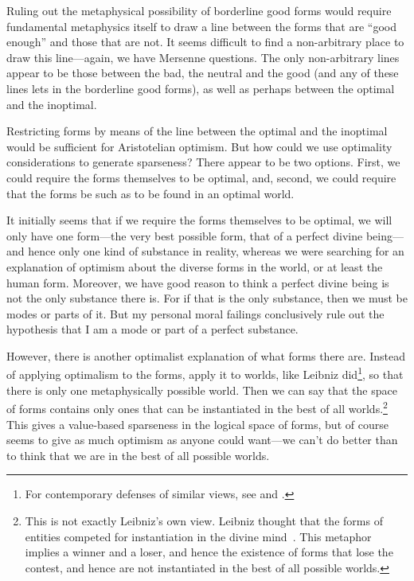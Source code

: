 Ruling out the metaphysical possibility of borderline good forms would require fundamental metaphysics itself to 
draw a line between the forms that are ``good enough'' and those that are not. It seems difficult to find a non-arbitrary
place to draw this line---again, we have Mersenne questions. The only non-arbitrary lines appear to be those between
the bad, the neutral and the good (and any of these lines lets in the borderline good forms), as well as perhaps 
between the optimal and the inoptimal.

Restricting forms by means of the line between the optimal and the inoptimal would be sufficient for Aristotelian 
optimism. But how could we use optimality considerations to generate sparseness? There appear to be two options. First,
we could require the forms themselves to be optimal, and, second, we could require that the forms be such as to be found
in an optimal world. 

It initially seems that if we require the forms themselves to be optimal, we will only have one form---the very best
possible form, that of a perfect divine being---and hence only one kind of substance in reality, whereas we were searching for an 
explanation of optimism about the diverse forms in the world, or at least the human form. Moreover, we have good reason to 
think a perfect divine being is not the only substance there is. For if that is the only substance, then we must be modes or 
parts of it. But my personal moral failings conclusively rule out the hypothesis that I am a mode or part of a perfect 
substance.

However, there is another optimalist explanation of what forms there are. Instead of applying optimalism to the forms, 
apply it to worlds, like Leibniz did\footnote{For contemporary defenses of similar views, see  and .}, so that there is only one metaphysically possible world. 
Then we can say that the space of forms contains only ones that 
can be instantiated in the best of all worlds.\footnote{This is not exactly Leibniz's own view. Leibniz thought
that the forms of entities competed for instantiation in the divine mind~\parencite[150]{LeibnizAG}. This metaphor implies a winner and a loser,
and hence the existence of forms that lose the contest, and hence are not instantiated in the best of all possible worlds.} 
This gives a value-based sparseness in the logical space of forms, but of course seems to give as much optimism as anyone could
want---we can't do better than to think that we are in the best of all possible worlds. 

